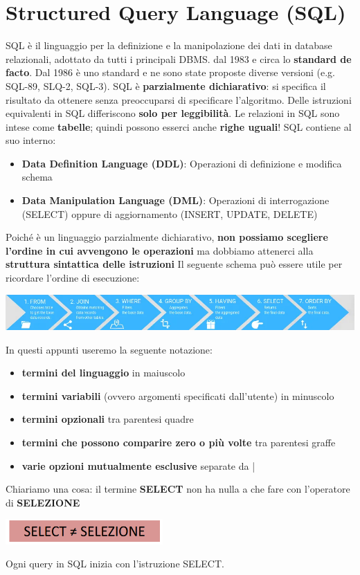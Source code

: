 \documentclass[12pt]{article}
\begin{document}
\section{Structured Query Language (SQL)}
SQL è il linguaggio per la definizione e la manipolazione dei dati in database relazionali, adottato da tutti i principali DBMS.
dal 1983 e circa lo \textbf{standard de facto}.
Dal 1986 è uno standard e ne sono state proposte diverse versioni (e.g. SQL-89, SLQ-2, SQL-3).
SQL è \textbf{parzialmente dichiarativo}: si specifica il risultato da ottenere senza preoccuparsi di specificare l'algoritmo.
Delle istruzioni equivalenti in SQL differiscono \textbf{solo per leggibilità}.
Le relazioni in SQL sono intese come \textbf{tabelle}; quindi possono esserci anche \textbf{righe uguali}!
SQL contiene al suo interno:
\begin{itemize}
    \item \textbf{Data Definition Language (DDL)}: Operazioni di definizione e modifica schema
    \item \textbf{Data Manipulation Language (DML)}: Operazioni di interrogazione (SELECT) oppure di aggiornamento (INSERT, UPDATE, DELETE)
\end{itemize}
Poiché è un linguaggio parzialmente dichiarativo, \textbf{non possiamo scegliere l'ordine in cui avvengono le operazioni} ma dobbiamo attenerci alla \textbf{struttura sintattica delle istruzioni}
Il seguente schema può essere utile per ricordare l'ordine di esecuzione:
\begin{center}
    \includegraphics[width = 1\textwidth]{Images/166.PNG}
\end{center}
In questi appunti useremo la seguente notazione:
\begin{itemize}
    \item \textbf{termini del linguaggio} in maiuscolo
    \item \textbf{termini variabili} (ovvero argomenti specificati dall'utente) in minuscolo
    \item \textbf{termini opzionali} tra parentesi quadre
    \item \textbf{termini che possono comparire zero o più volte} tra parentesi graffe
    \item \textbf{varie opzioni mutualmente esclusive} separate da |
\end{itemize}
Chiariamo una cosa: il termine \textbf{SELECT} non ha nulla a che fare con l'operatore di \textbf{SELEZIONE}
\begin{center}
    \includegraphics[width = 0.45\textwidth]{Images/167.PNG}
\end{center}
Ogni query in SQL inizia con l'istruzione SELECT.
\newpage
\end{document}
